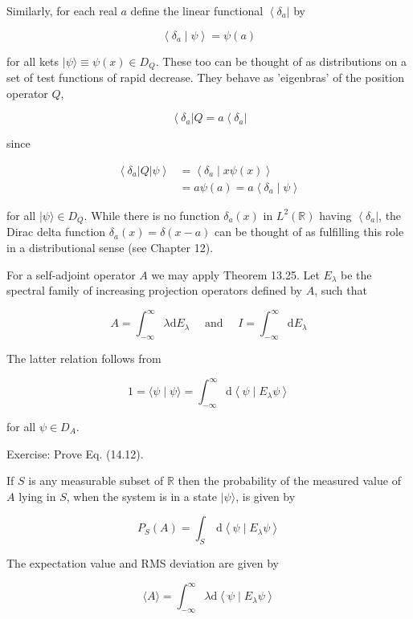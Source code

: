 \documentclass[10pt]{article}
\begin{document}
Similarly, for each real $a$ define the linear functional $\left\langle\delta_{a}\right|$ by

$$
\left\langle\delta_{a} \mid \psi\right\rangle=\psi(a)
$$

for all kets $|\psi\rangle \equiv \psi(x) \in D_{Q}$. These too can be thought of as distributions on a set of test functions of rapid decrease. They behave as 'eigenbras' of the position operator $Q$,

$$
\left\langle\delta_{a}\right| Q=a\left\langle\delta_{a}\right|
$$

since

$$
\begin{aligned}
\left\langle\delta_{a}|Q| \psi\right\rangle & =\left\langle\delta_{a} \mid x \psi(x)\right\rangle \\
& =a \psi(a)=a\left\langle\delta_{a} \mid \psi\right\rangle
\end{aligned}
$$

for all $|\psi\rangle \in D_{Q}$. While there is no function $\delta_{a}(x)$ in $L^{2}(\mathbb{R})$ having $\left\langle\delta_{a}\right|$, the Dirac delta function $\delta_{a}(x)=\delta(x-a)$ can be thought of as fulfilling this role in a distributional sense (see Chapter 12).

For a self-adjoint operator $A$ we may apply Theorem 13.25. Let $E_{\lambda}$ be the spectral family of increasing projection operators defined by $A$, such that

$$
A=\int_{-\infty}^{\infty} \lambda \mathrm{d} E_{\lambda} \quad \text { and } \quad I=\int_{-\infty}^{\infty} \mathrm{d} E_{\lambda}
$$

The latter relation follows from

$$
1=\langle\psi \mid \psi\rangle=\int_{-\infty}^{\infty} \mathrm{d}\left\langle\psi \mid E_{\lambda} \psi\right\rangle
$$

for all $\psi \in D_{A}$.

Exercise: Prove Eq. (14.12).

If $S$ is any measurable subset of $\mathbb{R}$ then the probability of the measured value of $A$ lying in $S$, when the system is in a state $|\psi\rangle$, is given by

$$
P_{S}(A)=\int_{S} \mathrm{~d}\left\langle\psi \mid E_{\lambda} \psi\right\rangle
$$

The expectation value and RMS deviation are given by

$$
\langle A\rangle=\int_{-\infty}^{\infty} \lambda \mathrm{d}\left\langle\psi \mid E_{\lambda} \psi\right\rangle
$$
\end{document}
